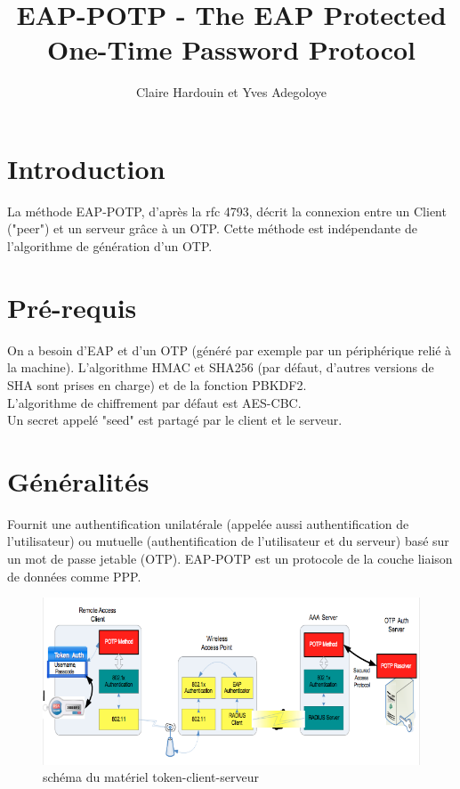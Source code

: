 \documentclass{../res/univ-projet}
\title{EAP-POTP - The EAP Protected One-Time Password Protocol}
\author{Claire Hardouin et Yves Adegoloye}
\begin{document}
\maketitle

\newpage
\tableofcontents
\newpage

\section{Introduction}
La méthode EAP-POTP, d'après la rfc 4793, décrit la connexion entre un Client ("peer") et un serveur grâce à un OTP.
Cette méthode est indépendante de l'algorithme de génération d'un OTP.

\section{Pré-requis}
On a besoin d'EAP et d'un OTP (généré par exemple par un périphérique relié à la machine).
L'algorithme HMAC et SHA256 (par défaut, d'autres versions de SHA sont prises en charge) et de la fonction PBKDF2.\\
L'algorithme de chiffrement par défaut est AES-CBC.\\

Un secret appelé "seed" est partagé par le client et le serveur.

\section{Généralités}
Fournit une authentification unilatérale (appelée aussi authentification de l'utilisateur) ou mutuelle (authentification de l'utilisateur et du serveur) basé sur un mot de passe jetable (OTP).
EAP-POTP est un protocole de la couche liaison de données comme PPP.

\begin{figure}[!h]
  \centering
  \includegraphics[width=400pt]{image2.png}
  \caption{schéma du matériel token-client-serveur}
  \label{fig:image}
\end{figure}
\end{document}
